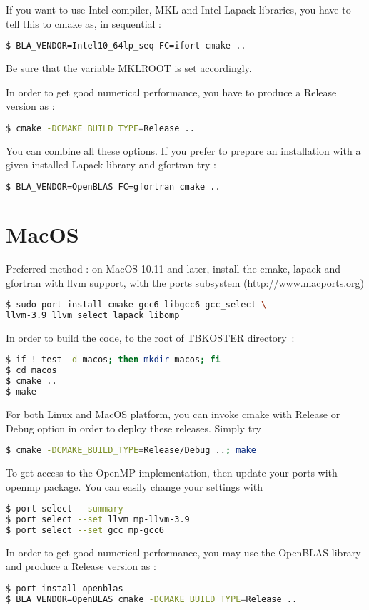 \documentclass[12pt, onecolumn]{memoir}
\begin{document}
If you want to use Intel compiler, MKL and Intel Lapack libraries, you have to tell this to cmake as, in sequential :
\begin{lstlisting}[language=sh,basicstyle=\small]
$ BLA_VENDOR=Intel10_64lp_seq FC=ifort cmake ..
\end{lstlisting}
Be sure that the variable MKLROOT is set accordingly.

In order to get good numerical performance, you have to produce a Release version as :
\begin{lstlisting}[language=sh,basicstyle=\small]
$ cmake -DCMAKE_BUILD_TYPE=Release ..
\end{lstlisting}
You can combine all these options.
If you prefer to prepare an installation with a given installed Lapack library and gfortran try :
\begin{lstlisting}[language=sh,basicstyle=\small]
$ BLA_VENDOR=OpenBLAS FC=gfortran cmake ..
\end{lstlisting}
\section{MacOS}
Preferred method : on MacOS 10.11 and later, install the cmake, lapack and gfortran with llvm support, with the ports subsystem (http://www.macports.org)
\begin{lstlisting}[language=sh,basicstyle=\small]
$ sudo port install cmake gcc6 libgcc6 gcc_select \
llvm-3.9 llvm_select lapack libomp
\end{lstlisting}
In order to build the code, to the root of TBKOSTER directory~:
\begin{lstlisting}[language=sh,basicstyle=\small]
$ if ! test -d macos; then mkdir macos; fi
$ cd macos
$ cmake ..
$ make
\end{lstlisting}
For both Linux and MacOS platform, you can invoke cmake with Release or Debug option in order to deploy these releases. Simply try
\begin{lstlisting}[language=sh,basicstyle=\small]
$ cmake -DCMAKE_BUILD_TYPE=Release/Debug ..; make
\end{lstlisting}
To get access to the OpenMP implementation, then update your ports with openmp package. You can easily change your settings with
\begin{lstlisting}[language=sh,basicstyle=\small]
$ port select --summary
$ port select --set llvm mp-llvm-3.9
$ port select --set gcc mp-gcc6
\end{lstlisting}
In order to get good numerical performance, you may use the OpenBLAS library and produce a Release version as :
\begin{lstlisting}[language=sh,basicstyle=\small]
$ port install openblas
$ BLA_VENDOR=OpenBLAS cmake -DCMAKE_BUILD_TYPE=Release ..
\end{lstlisting}
\end{document}
